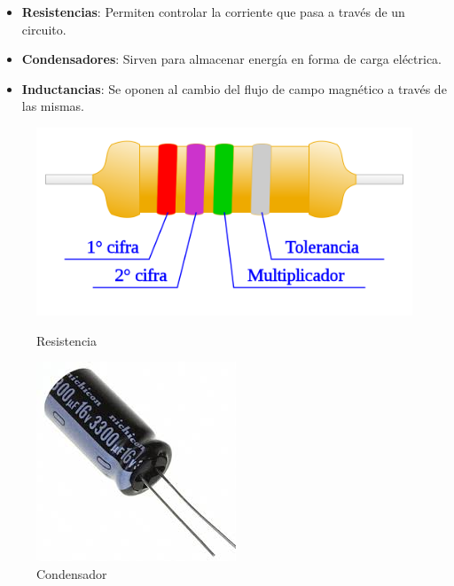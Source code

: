 \documentclass[prb,aps,preprintnumbers,amsmath,amssymb]{revtex4}
\begin{document}
\begin{itemize}
	\item \textbf{Resistencias}: Permiten controlar la corriente que pasa a través de un circuito.
		
	\item \textbf{Condensadores}: Sirven para almacenar energía en forma de carga eléctrica. 
	
	\item \textbf{Inductancias}: Se oponen al cambio del flujo de campo magnético a través de las mismas.
\end{itemize}

\begin{figure}
\centering
\begin{minipage}{.33\textwidth}
  \centering
  \includegraphics[width=.7\textwidth,height=0.15\textheight]{resistencia}
  \caption{Resistencia}
  \label{fig: resistencia}
\end{minipage}%
\begin{minipage}{.33\textwidth}
  \centering
  \includegraphics[width=.7\textwidth,height=0.15\textheight]{condensador}
  \caption{Condensador}
  \label{fig: condensador}
\end{minipage}
\begin{minipage}{.33\textwidth}

\end{minipage}
\end{figure}
\end{document}
